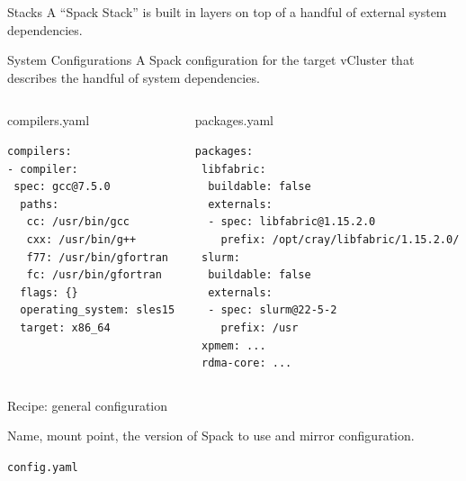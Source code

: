 \documentclass[aspectratio=43]{beamer}
\begin{document}
\begin{frame}[fragile]{Stacks}
    A ``Spack Stack'' is built in layers on top of a handful of external system dependencies.
    \begin{center}
        
    \end{center}
\end{frame}


\begin{frame}[fragile]{System Configurations}
    A Spack configuration for the target vCluster that describes the handful of system dependencies.

    \begin{columns}[T]
        \begin{column}{0.5\textwidth}
        \begin{codecolumn}{compilers.yaml}
            \begin{lstlisting}[style=talkyaml]
compilers:
- compiler:
 spec: gcc@7.5.0
  paths:
   cc: /usr/bin/gcc
   cxx: /usr/bin/g++
   f77: /usr/bin/gfortran
   fc: /usr/bin/gfortran
  flags: {}
  operating_system: sles15
  target: x86_64
            \end{lstlisting}
        \end{codecolumn}
        \end{column}
        \begin{column}{0.5\textwidth}
        \begin{codecolumn}{packages.yaml}
            \begin{lstlisting}[style=talkyaml]
packages:
 libfabric:
  buildable: false
  externals:
  - spec: libfabric@1.15.2.0
    prefix: /opt/cray/libfabric/1.15.2.0/
 slurm:
  buildable: false
  externals:
  - spec: slurm@22-5-2
    prefix: /usr
 xpmem: ...
 rdma-core: ...
            \end{lstlisting}
        \end{codecolumn}
        \end{column}
    \end{columns}
\end{frame}

\begin{frame}[fragile]{Recipe: general configuration}

Name, mount point, the version of Spack to use and mirror configuration.

\begin{code}{\lstinline{config.yaml}}

\end{code}

\end{frame}
\end{document}
